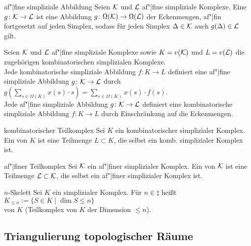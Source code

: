 \begin{Def}{af"|fine simpliziale Abbildung}
    Seien $\mathcal{K}$ und $\mathcal{L}$ af"|fine simpliziale Komplexe.
    Eine 
    $g\colon \mathcal{K} \rightarrow \mathcal{L}$ ist eine Abbildung
    $g\colon \Omega(\mathcal{K}) \rightarrow \Omega(\mathcal{L})$ der Eckenmengen,
    af"|fin fortgesetzt auf jeden Simplex, sodass
    für jeden Simplex $\Delta \in \mathcal{K}$ auch $g(\Delta) \in \mathcal{L}$ gilt.
\end{Def}

\begin{Bem}
    Seien $\mathcal{K}$ und $\mathcal{L}$ af"|fine simpliziale Komplexe sowie
    $K = v(\mathcal{K})$ und $L = v(\mathcal{L})$ die zugehörigen kombinatorischen simplizialen
    Komplexe. \\
    Jede kombinatorische simpliziale Abbildung $f\colon K \rightarrow L$
    definiert eine af"|fine simpliziale Abbildung $g\colon \mathcal{K} \rightarrow \mathcal{L}$
    durch $g(\sum_{s \in \Omega(K)} x(s) \cdot s) =
    \sum_{s \in \Omega(K)} x(s) \cdot f(s)$. \\
    Jede af"|fine simpliziale Abbildung $g\colon \mathcal{K} \rightarrow \mathcal{L}$ definiert
    eine kombinatorische simpliziale Abbildung $f\colon K \rightarrow L$
    durch Einschränkung auf die Eckenmengen.
\end{Bem}

\linie

\begin{Def}{kombinatorischer Teilkomplex}
    Sei $K$ ein kombinatorischer simplizialer Komplex.
    Ein  von $K$ ist eine Teilmenge $L \subset K$,
    die selbst ein komb. simplizialer Komplex ist.
\end{Def}

\begin{Def}{af"|finer Teilkomplex}
    Sei $\mathcal{K}$ ein af"|finer simplizialer Komplex.
    Ein  von $\mathcal{K}$ ist eine Teilmenge $\mathcal{L} \subset \mathcal{K}$,
    die selbst ein af"|finer simplizialer Komplex ist.
\end{Def}

\begin{Def}{$n$-Skelett}
    Sei $K$ ein simplizialer Komplex.
    Für $n \in \natural$ heißt
    $K_{\le n} := \{S \in K \;|\; \dim S \le n\}$ \\
     von $K$
    (Teilkomplex von $K$ der Dimension $\le n$).
\end{Def}

\subsection{%
    Triangulierung topologischer Räume%
}

